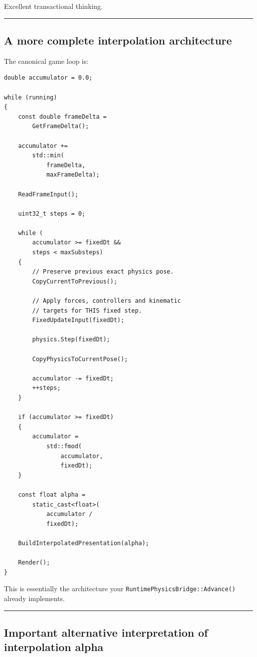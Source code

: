Excellent transactional thinking.

\begin{center}\rule{0.5\linewidth}{0.5pt}\end{center}

\subsection{A more complete interpolation architecture}\label{06-engine-ii-ch038-a-more-complete-interpolation-architecture}

The canonical game loop is:

\begin{verbatim}
double accumulator = 0.0;

while (running)
{
    const double frameDelta =
        GetFrameDelta();

    accumulator +=
        std::min(
            frameDelta,
            maxFrameDelta);

    ReadFrameInput();

    uint32_t steps = 0;

    while (
        accumulator >= fixedDt &&
        steps < maxSubsteps)
    {
        // Preserve previous exact physics pose.
        CopyCurrentToPrevious();

        // Apply forces, controllers and kinematic
        // targets for THIS fixed step.
        FixedUpdateInput(fixedDt);

        physics.Step(fixedDt);

        CopyPhysicsToCurrentPose();

        accumulator -= fixedDt;
        ++steps;
    }

    if (accumulator >= fixedDt)
    {
        accumulator =
            std::fmod(
                accumulator,
                fixedDt);
    }

    const float alpha =
        static_cast<float>(
            accumulator /
            fixedDt);

    BuildInterpolatedPresentation(alpha);

    Render();
}
\end{verbatim}

This is essentially the architecture your \texttt{RuntimePhysicsBridge::Advance()} already implements.

\begin{center}\rule{0.5\linewidth}{0.5pt}\end{center}

\subsection{Important alternative interpretation of interpolation alpha}\label{06-engine-ii-ch038-important-alternative-interpretation-of-interpolation-alpha}

